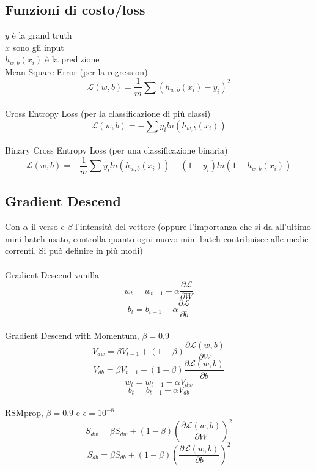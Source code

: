 \documentclass[]{article}
\newcommand{\Lagr}{\mathcal{L}}
\begin{document}
\subsection{Funzioni di costo/loss}
$y$ è la grand truth \\
$x$ sono gli input \\ 
$h_{w,b}(x_i)$ è la predizione\\


Mean Square Error (per la regression)\\

\[ \Lagr(w,b) = \frac{1}{m} \sum{(h_{w,b}(x_i) - {y_i})}^2 \] \\

Cross Entropy Loss (per la classificazione di più classi) \\
\[ \Lagr(w,b) = - \sum y_i ln(h_{w,b}(x_i)) \] \\

Binary Cross Entropy Loss (per una classificazione binaria) \\
\[ \Lagr(w,b) = - \frac{1}{m}\sum y_i ln(h_{w,b}(x_i)) + (1-y_i)ln(1-h_{w,b}(x_i)) \]


\subsection{Gradient Descend}
Con $\alpha$ il verso e $\beta$ l'intensità del vettore (oppure l'importanza che si da all'ultimo mini-batch usato, controlla quanto ogni nuovo mini-batch contribuisce alle medie correnti. Si può definire in più modi) \\ \\

Gradient Descend vanilla \\
\[w_t = w_{t-1} - \alpha \frac{\partial \Lagr}{\partial W}   \]
\[b_t = b_{t-1} - \alpha \frac{\partial \Lagr}{\partial b}   \]\\

Gradient Descend with Momentum, $\beta = 0.9$ \\
\[ V_{dw} = \beta V_{t-1} + (1- \beta) \frac{ \partial \Lagr(w,b)}{\partial W} \]
\[ V_{db} = \beta V_{t-1} + (1- \beta) \frac{ \partial \Lagr(w,b)}{\partial b} \]
\[w_t = w_{t-1} - \alpha V_{dw}   \]
\[b_t = b_{t-1} - \alpha V_{db}   \]\\

RSMprop, $\beta = 0.9$ e $\epsilon = 10^{-8}$
\[ S_{dw} = \beta S_{dw} + (1- \beta) (\frac{ \partial \Lagr(w,b)}{\partial W})^2 \]
\[ S_{db} = \beta S_{db} + (1- \beta) (\frac{ \partial \Lagr(w,b)}{\partial b})^2 \]
\end{document}
